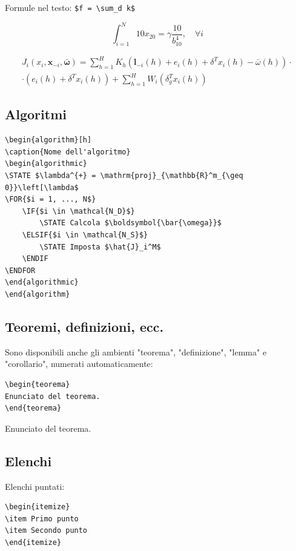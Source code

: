 \documentclass{00-settings/document}
\begin{document}
Formule nel testo: \verb|$f = \sum_d k$|

\begin{equation}
\label{eq:equazioneEsempio}
\int_{i=1}^{N}10x_{20}=\gamma \frac{10}{b_{10}^{4}}, \quad \forall i
\end{equation}

\begin{multline}
J_i(x_{i},\boldsymbol {x}_{-i} ,\boldsymbol {\bar{\omega}})  =\sum_{h=1}^{H} K_{h} (\boldsymbol l_{-i}(h) + e_i(h) + \delta^{T} x_{i}(h)- \bar{\omega}(h)) \cdot \\
 \cdot (e_i(h) +\delta^{T} x_{i}(h))  + \sum_{h=1}^{H} W_{i} (\delta_{g}^{T} x_{i}(h))
\label{eq:equazioneEsempioLunga}
\end{multline}

\subsection{Algoritmi}
\begin{verbatim}
\begin{algorithm}[h]
\caption{Nome dell'algoritmo}
\begin{algorithmic}
\STATE $\lambda^{+} = \mathrm{proj}_{\mathbb{R}^m_{\geq 0}}\left[\lambda$
\FOR{$i = 1, ..., N$}
    \IF{$i \in \mathcal{N_D}$}
        \STATE Calcola $\boldsymbol{\bar{\omega}}$
    \ELSIF{$i \in \mathcal{N_S}$}
        \STATE Imposta $\hat{J}_i^M$
    \ENDIF
\ENDFOR
\end{algorithmic}
\end{algorithm}
\end{verbatim}

\subsection{Teoremi, definizioni, ecc.}
Sono disponibili anche gli ambienti "teorema", "definizione", "lemma" e "corollario", numerati automaticamente:
\begin{verbatim}
\begin{teorema}
Enunciato del teorema.
\end{teorema}
\end{verbatim}
\begin{teorema}
Enunciato del teorema.
\end{teorema}

\subsection{Elenchi}
Elenchi puntati:
\begin{verbatim}
\begin{itemize}
\item Primo punto
\item Secondo punto
\end{itemize}
\end{verbatim}
\end{document}
